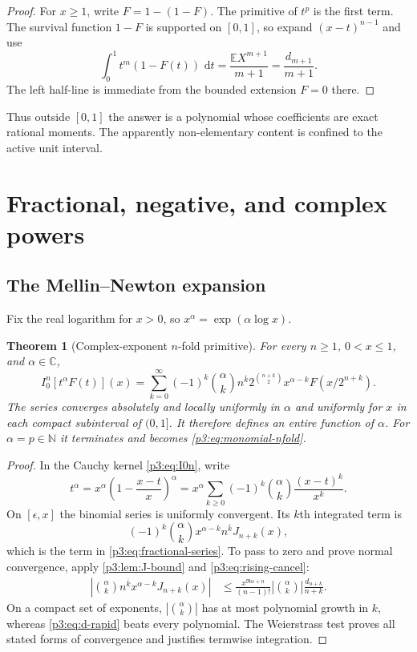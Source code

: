 \documentclass[11pt,oneside]{article}
\newtheorem{theorem}{Theorem}[section]
\theoremstyle{definition}
\theoremstyle{remark}
\newcommand{\E}{\mathbb E}
\newcommand{\C}{\mathbb C}
\newcommand{\N}{\mathbb N}
\newcommand{\dd}{\,\mathrm d}
\newcommand{\rise}[2]{#1^{\overline{#2}}}
\newcommand{\1}{\mathbf 1}
\begin{document}
\begin{proof}
For $x\ge1$, write $F=1-(1-F)$.  The primitive of $t^p$ is the first term.  The survival
function $1-F$ is supported on $[0,1]$, so expand $(x-t)^{n-1}$ and use
\[
 \int_0^1t^m(1-F(t))\,\dd t=\frac{\E X^{m+1}}{m+1}=\frac{d_{m+1}}{m+1}.
\]
The left half-line is immediate from the bounded extension $F=0$ there.
\end{proof}

Thus outside $[0,1]$ the answer is a polynomial whose coefficients are exact rational
moments.  The apparently non-elementary content is confined to the active unit interval.

\section{Fractional, negative, and complex powers}
\label{p3:sec:fractional}

\subsection{The Mellin--Newton expansion}

Fix the real logarithm for $x>0$, so $x^\alpha=\exp(\alpha\log x)$.

\begin{theorem}[Complex-exponent $n$-fold primitive]
\label{p3:thm:fractional-series}
For every $n\ge1$, $0<x\le1$, and $\alpha\in\C$,
\begin{equation}
 \boxed{
 I_0^n[t^\alpha F(t)](x)
 =\sum_{k=0}^{\infty}(-1)^k\binom\alpha k\rise nk
 2^{\binom{n+k}{2}}x^{\alpha-k}F(x/2^{n+k}).}
 \label{p3:eq:fractional-series}
\end{equation}
The series converges absolutely and locally uniformly in $\alpha$ and uniformly for $x$ in
each compact subinterval of $(0,1]$.  It therefore defines an entire function of $\alpha$.
For $\alpha=p\in\N$ it terminates and becomes \eqref{p3:eq:monomial-nfold}.
\end{theorem}

\begin{proof}
In the Cauchy kernel \eqref{p3:eq:I0n}, write
\[
 t^\alpha=x^\alpha\left(1-\frac{x-t}{x}\right)^\alpha
 =x^\alpha\sum_{k\ge0}(-1)^k\binom\alpha k\frac{(x-t)^k}{x^k}.
\]
On $[\epsilon,x]$ the binomial series is uniformly convergent.  Its $k$th integrated term is
\[
 (-1)^k\binom\alpha kx^{\alpha-k}\rise nk J_{n+k}(x),
\]
which is the term in \eqref{p3:eq:fractional-series}.  To pass to zero and prove normal
convergence, apply \cref{p3:lem:J-bound} and \eqref{p3:eq:rising-cancel}:
\begin{align}
 \left|\binom\alpha k\rise nkx^{\alpha-k}J_{n+k}(x)\right|
 &\le
 \frac{x^{\Re\alpha+n}}{(n-1)!}
 \left|\binom\alpha k\right|\frac{d_{n+k}}{n+k}.              \label{p3:eq:normal-bound}
\end{align}
On a compact set of exponents, $|\binom\alpha k|$ has at most polynomial growth in $k$,
whereas \eqref{p3:eq:d-rapid} beats every polynomial.  The Weierstrass test proves all stated
forms of convergence and justifies termwise integration.
\end{proof}
\end{document}
